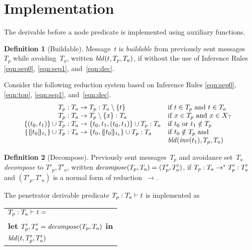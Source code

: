 \documentclass[12pt]{report}
\theoremstyle{definition}
\newtheorem{defn}{Definition}[chapter]
\begin{document}
\section{Implementation}\label{sec:derivable implementation}

The derivable before a node predicate is implemented using auxiliary
functions.

\begin{defn}[Buildable]
Message~$t$ is \emph{buildable} from previously sent
messages~$T_p$ while avoiding~$T_a$, written $\fn{bld}(t,T_p,T_a)$, if
 without the use of Inference Rules \ref{eqn:sep0},
\ref{eqn:sep1}, and~\ref{eqn:dec}.
\end{defn}

Consider the following reduction system based on Inference Rules
\ref{eqn:sep0}, \ref{eqn:top}, \ref{eqn:sep1}, and~\ref{eqn:dec}.
$$\begin{array}{r@{}c@{}ll}
\dctx{T_p}{T_a}&{}\to{}&\dctx{T_p}{T_a\setminus\{t\}}
&\mbox{if $t\in T_p$ and $t\in T_a$}\\
\dctx{T_p}{T_a}&{}\to{}&\dctx{T_p\setminus\{x\}}{T_a}
&\mbox{if $x\in T_p$ and $x\in X_{\top}$}\\
\dctx{\{(t_0,t_1)\}\cup T_p}{T_a}&{}\to{}
&\dctx{\{t_0,t_1,(t_0,t_1)\}\cup T_p}{T_a}
&\mbox{if $t_0$ or $t_1\notin T_p$}\\
\dctx{\{\enc{t_0}{t_1}\}\cup
T_p}{T_a}&{}\to{}&\dctx{\{t_0,\enc{t_0}{t_1}\}\cup T_p}{T_a}
&\mbox{if $t_0\notin T_p$ and}\\
&&&\fn{bld}(\fn{inv}(t_1),T_p,T_a)
\end{array}$$

\begin{defn}[Decompose]\label{def:decompose}
Previously sent messages~$T_p$ and avoidance set~$T_a$
\emph{decompose} to $T'_p,T'_a$, written
$\fn{decompose}(T_p,T_a)=(T'_p,T'_a)$, if
$\dctx{T_p}{T_a}\to^\ast\dctx{T'_p}{T'_a}$
and $(T'_p,T'_a)$ is a normal form of reduction~$\to$.
\end{defn}

The penetrator derivable predicate $\der{t}{T_p}{T_a}$ is implemented as
\begin{center}
\begin{tabular}{l}
$\der{t}{T_p}{T_a}={}$\\
\quad\textbf{let} $T'_p, T'_a=\fn{decompose}(T_p,T_a)$ \textbf{in}\\
\quad$\fn{bld}(t,T'_p,T'_a)$
\end{tabular}
\end{center}
\end{document}

